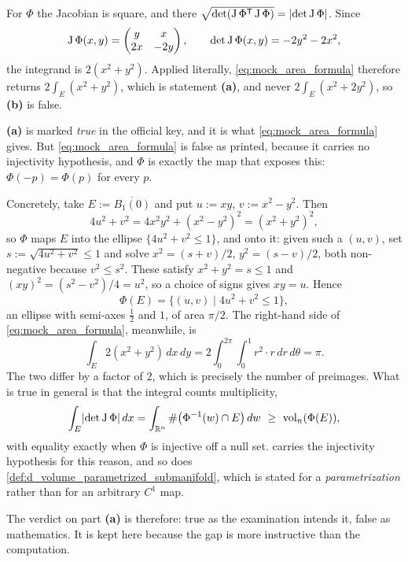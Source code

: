 \begin{exercisesolution}
For $\Phi$ the Jacobian is square, and there $\sqrt{\det(\operatorname{J}\Phi^{\mathsf{T}}\operatorname{J}\Phi)} =
\lvert\det\operatorname{J}\Phi\rvert$. Since
\[\operatorname{J}\Phi(x,y) = \begin{pmatrix} y & x \\ 2x & -2y \end{pmatrix}, \qquad
  \det\operatorname{J}\Phi(x,y) = -2y^2 - 2x^2,\]
the integrand is $2(x^2+y^2)$. Applied literally, \eqref{eq:mock_area_formula} therefore returns
$2\int_E(x^2+y^2)$, which is statement \textbf{(a)}, and never $2\int_E(x^2+2y^2)$, so
\textbf{(b)} is false.
\end{exercisesolution}

\begin{ainote}
\label{note:area_formula_needs_injectivity}
\textbf{(a)} is marked \emph{true} in the official key, and it is
what \eqref{eq:mock_area_formula} gives. But \eqref{eq:mock_area_formula} is false as printed,
because it carries no injectivity hypothesis, and $\Phi$ is exactly the map that exposes this:
$\Phi(-p) = \Phi(p)$ for every $p$.

Concretely, take $E := \overline{B_1(0)}$ and put $u := xy$, $v := x^2-y^2$. Then
\[4u^2 + v^2 = 4x^2y^2 + (x^2-y^2)^2 = (x^2+y^2)^2 ,\]
so $\Phi$ maps $E$ into the ellipse $\{4u^2+v^2 \leq 1\}$, and onto it: given such a $(u,v)$,
set $s := \sqrt{4u^2+v^2} \leq 1$ and solve $x^2 = (s+v)/2$, $y^2 = (s-v)/2$, both non-negative
because $v^2 \leq s^2$. These satisfy $x^2+y^2 = s \leq 1$ and $(xy)^2 = (s^2-v^2)/4 = u^2$, so a
choice of signs gives $xy = u$. Hence
\[\Phi(E) = \{(u,v) \mid 4u^2+v^2 \leq 1\},\]
an ellipse with semi-axes $\tfrac12$ and $1$, of area $\pi/2$. The right-hand side of
\eqref{eq:mock_area_formula}, meanwhile, is
\[\int_E 2(x^2+y^2)\,dx\,dy = 2\int_0^{2\pi}\!\!\int_0^1 r^2\cdot r\,dr\,d\theta = \pi .\]
The two differ by a factor of $2$, which is precisely the number of preimages. What is true in
general is that the integral counts multiplicity,
\[\int_E \lvert\det\operatorname{J}\Phi\rvert\,dx = \int_{\mathbb{R}^n} \#\big(\Phi^{-1}(w)\cap E\big)\,dw
  \ \geq\ \operatorname{vol}_n(\Phi(E)),\]
with equality exactly when $\Phi$ is injective off a null set. 
carries the injectivity hypothesis for this reason, and so does
\cref{def:d_volume_parametrized_submanifold}, which is stated for a \emph{parametrization} rather
than for an arbitrary $C^1$ map.

The verdict on part \textbf{(a)} is therefore: true as the examination intends it, false as
mathematics. It is kept here because the gap is more instructive than the computation.
\end{ainote}

